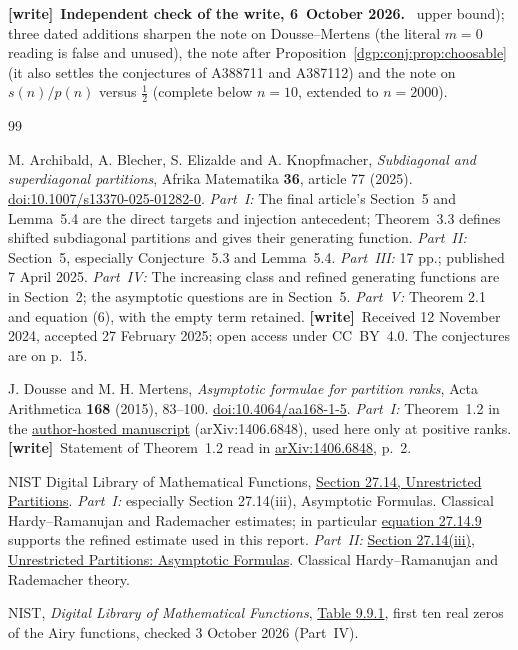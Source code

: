 \documentclass[11pt,letterpaper]{article}
\numberwithin{equation}{section}
\theoremstyle{remark}\newtheorem{remark}[theorem]{Remark}
\newenvironment{writenote}[1][]{\par\smallskip\begingroup\small
 \noindent\textbf{[write]}\if\relax\detokenize{#1}\relax\else~\textbf{#1.}\fi\ }%
 {\par\endgroup\smallskip}
\newcommand{\wtag}{\textup{\textbf{[write]}}}
\begin{document}
\begin{writenote}[Independent check of the write, 6~October 2026]
upper bound); three dated additions sharpen the note on Dousse--Mertens (the literal $m=0$ reading is false and unused), the note after Proposition~\ref{dgp:conj:prop:choosable} (it also settles the conjectures of A388711 and A387112) and the note on $s(n)/p(n)$ versus $\frac12$ (complete below $n=10$, extended to $n=2000$).
\end{writenote}

\begin{thebibliography}{99}
\raggedright
{}
M. Archibald, A. Blecher, S. Elizalde and A. Knopfmacher,
\emph{Subdiagonal and superdiagonal partitions},
Afrika Matematika \textbf{36}, article 77 (2025).
\href{https://doi.org/10.1007/s13370-025-01282-0}{doi:10.1007/s13370-025-01282-0}.
\emph{Part~I:} The final article's Section~5 and Lemma~5.4 are the direct targets
and injection antecedent; Theorem~3.3 defines shifted subdiagonal
partitions and gives their generating function.
\emph{Part~II:} Section~5, especially Conjecture~5.3 and Lemma~5.4.
\emph{Part~III:} 17 pp.; published 7 April 2025.
\emph{Part~IV:} The increasing class and refined generating functions are in Section~2;
the asymptotic questions are in Section~5.
\emph{Part~V:} Theorem 2.1 and equation (6), with the empty term retained.
\wtag\ Received 12 November 2024, accepted 27 February 2025; open access under CC~BY~4.0. The conjectures are on p.~15.

J. Dousse and M. H. Mertens,
\emph{Asymptotic formulae for partition ranks},
Acta Arithmetica \textbf{168} (2015), 83--100.
\href{https://doi.org/10.4064/aa168-1-5}{doi:10.4064/aa168-1-5}.
\emph{Part~I:} Theorem~1.2 in the
\href{https://www.unige.ch/~doussej/rank.pdf}{author-hosted manuscript}
(arXiv:1406.6848), used here only at positive ranks.
\wtag\ Statement of Theorem~1.2 read in \href{https://arxiv.org/abs/1406.6848}{arXiv:1406.6848}, p.~2.

NIST Digital Library of Mathematical Functions,
\href{https://dlmf.nist.gov/27.14}{Section 27.14, Unrestricted Partitions}.
\emph{Part~I:} especially Section 27.14(iii), Asymptotic Formulas.
Classical Hardy--Ramanujan and Rademacher estimates; in particular
\href{https://dlmf.nist.gov/27.14.E9}{equation 27.14.9} supports
the refined estimate used in this report.
\emph{Part~II:} \href{https://dlmf.nist.gov/27.14#iii}{Section 27.14(iii),
Unrestricted Partitions: Asymptotic Formulas}.
Classical Hardy--Ramanujan and Rademacher theory.

NIST, \emph{Digital Library of Mathematical Functions},
\href{https://dlmf.nist.gov/9.9.T1}{Table 9.9.1}, first ten real zeros
of the Airy functions, checked 3 October 2026 (Part~IV).


\end{thebibliography}
\end{document}

